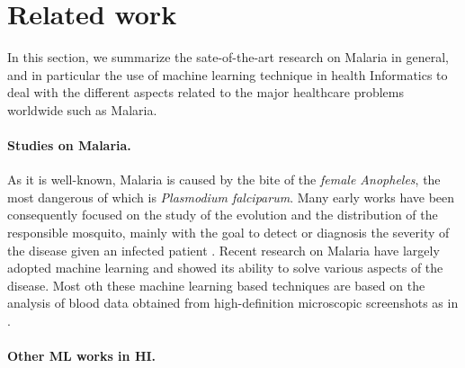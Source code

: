 \section{Related work}\label{related_work}
In this section, we summarize the sate-of-the-art research on Malaria in general, and in particular the
use of machine learning technique in health Informatics to deal with the different aspects related to the 
major healthcare problems worldwide such as Malaria.

\paragraph*{Studies on Malaria.}
As it is well-known, Malaria is caused by the bite of the \emph{female Anopheles}, the most dangerous of which
is \emph{Plasmodium falciparum}. Many early works have been consequently focused on the study of the evolution and
the distribution of the responsible mosquito, mainly with the goal to detect or diagnosis the severity of the 
disease given an infected patient \cite{Fe03,Al09}. Recent research on Malaria have largely adopted machine learning
and showed its ability to solve various aspects of the disease. Most oth these machine learning based techniques are 
based on the analysis of blood data obtained from high-definition microscopic screenshots as in \cite{Ku18}.

\paragraph*{Other ML works in HI.}
